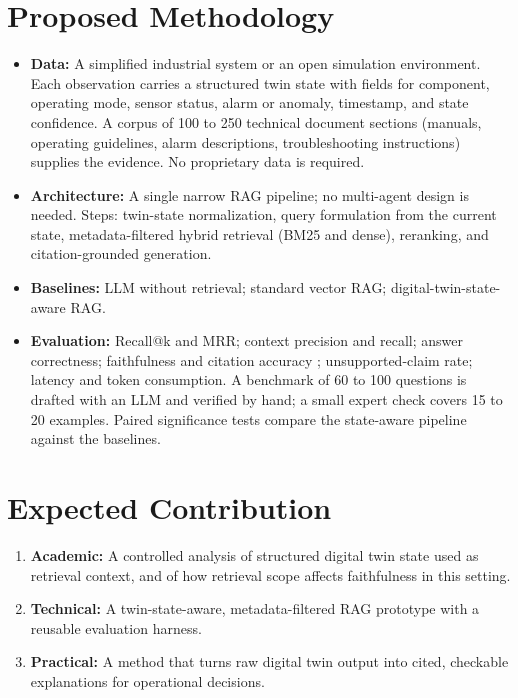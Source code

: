 \documentclass[10pt,a4paper]{article}
\begin{document}
\section{Proposed Methodology}

\begin{itemize}
    \item \textbf{Data:} A simplified industrial system or an open simulation environment. Each observation carries a structured twin state with fields for component, operating mode, sensor status, alarm or anomaly, timestamp, and state confidence. A corpus of 100 to 250 technical document sections (manuals, operating guidelines, alarm descriptions, troubleshooting instructions) supplies the evidence. No proprietary data is required.
    \item \textbf{Architecture:} A single narrow RAG pipeline; no multi-agent design is needed. Steps: twin-state normalization, query formulation from the current state, metadata-filtered hybrid retrieval (BM25 and dense), reranking, and citation-grounded generation.
    \item \textbf{Baselines:} LLM without retrieval; standard vector RAG; digital-twin-state-aware RAG.
    \item \textbf{Evaluation:} Recall@k and MRR; context precision and recall; answer correctness; faithfulness and citation accuracy \cite{es2024ragas}; unsupported-claim rate; latency and token consumption. A benchmark of 60 to 100 questions is drafted with an LLM and verified by hand; a small expert check covers 15 to 20 examples. Paired significance tests compare the state-aware pipeline against the baselines.
\end{itemize}

\section{Expected Contribution}

\begin{enumerate}
    \item \textbf{Academic:} A controlled analysis of structured digital twin state used as retrieval context, and of how retrieval scope affects faithfulness in this setting.
    \item \textbf{Technical:} A twin-state-aware, metadata-filtered RAG prototype with a reusable evaluation harness.
    \item \textbf{Practical:} A method that turns raw digital twin output into cited, checkable explanations for operational decisions.
\end{enumerate}
\end{document}
